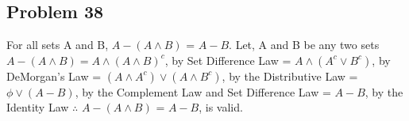 \documentclass{article}
\begin{document}
	\subsection*{Problem 38}
	For all sets A and B, $A - (A \land B)$ = $A - B$.
	\newline
	Let, A and B be any two sets
	\newline
	$A - (A \land B) = A \land (A \land B)^{c}$, by Set Difference Law
	\newline
	= $A \land (A^{c} \lor B^{c})$, by DeMorgan's Law
	\newline
	= $(A \land A^{c}) \lor (A \land B^{c})$, by the Distributive Law
	\newline
	= $\phi \lor (A - B)$, by the Complement Law and Set Difference Law
	\newline
	= $A - B$, by the Identity Law
	\newline
	$\therefore$ $A - (A \land B)$ = $A - B$, is valid.
	
\end{document}
